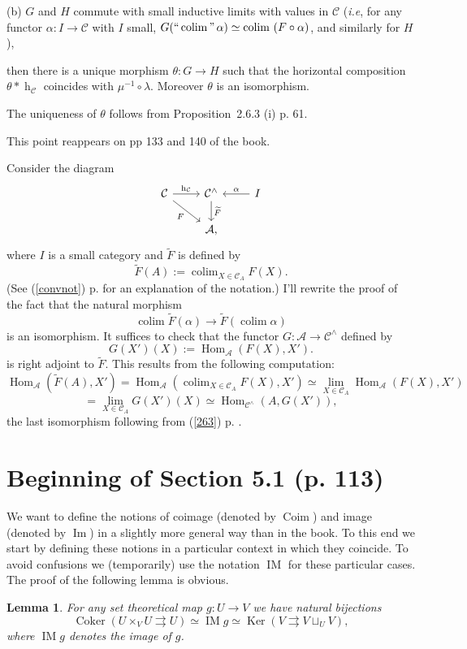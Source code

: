 \documentclass[12pt]{article}
\newtheorem{lem}[thm]{Lemma}
\theoremstyle{remark}
\newcommand{\n}{\noindent}
\newcommand{\A}{\mathcal A}
\newcommand{\C}{\mathcal C}
\newcommand{\pa}{\rightrightarrows}
\newcommand{\pr}{Proposition}
\newcommand{\cn}{(See (\ref{convnot}) p. \pageref{convnot} for an explanation of the notation.) }
\DeclareMathOperator*{\coli}{colim}
\DeclareMathOperator*{\co}{colim}
\DeclareMathOperator*{\ic}{``\coli"}
\DeclareMathOperator{\Coim}{Coim}
\DeclareMathOperator{\Coker}{Coker}
\DeclareMathOperator{\Ima}{Im}
\DeclareMathOperator{\IM}{IM}
\DeclareMathOperator{\hy}{h}
\DeclareMathOperator{\Hom}{Hom}
\DeclareMathOperator{\Ker}{Ker}
\begin{document}
\n(b) $G$ and $H$ commute with small inductive limits with values in $\C$ ({\em i.e}, for any functor $\alpha:I\to\C$ with $I$ small, $G(\ic\alpha)\simeq\co\ (F\circ\alpha)$, and similarly for $H$), 

\n then there is a unique morphism $\theta:G\to H$ such that the horizontal composition $\theta*\hy_\C$ coincides with $\mu^{-1}\circ\lambda$. Moreover $\theta$ is an isomorphism. 

The uniqueness of $\theta$ follows from \pr\ 2.6.3 (i) p. 61. 

This point reappears on pp 133 and 140 of the book. 

\n{\em Comment 2.} Consider the diagram 
%
\begin{equation}\label{271b}
\begin{tikzcd}
\C\ar{r}{\hy_\C}\ar{dr}[swap]{F}&\C^\wedge\ar{d}{\widetilde F}&I\ar{l}[swap]{\alpha}\\
&\A,
\end{tikzcd}
\end{equation} 
% 
where $I$ is a small category and $\widetilde F$ is defined by 
$$
\widetilde F(A):=\coli_{X\in\C_A}F(X). 
$$
\cn I'll rewrite the proof of the fact that the natural morphism 
%
$$
\coli\widetilde F(\alpha)\to
\widetilde F\left(\coli\alpha\right) 
$$ 
% 
is an isomorphism. It suffices to check that the functor $G:\A\to\C^\wedge$ defined by 
$$
G(X')(X):=\Hom_{\A}(F(X),X').
$$ 
is right adjoint to $\widetilde F$. This results from the following computation: 
$$
\Hom_{\A}\left(\widetilde F(A),X'\right)=
\Hom_{\A}\left(\coli_{X\in\C_A}F(X),X'\right)\simeq 
\lim_{X\in\C_A}\Hom_{\A}(F(X),X')
$$
$$
=\lim_{X\in\C_A}G(X')(X)\simeq\Hom_{\C^\wedge}(A,G(X')), 
$$ 
the last isomorphism following from (\ref{263}) p. \pageref{263}. 
% 
\section{Beginning of Section 5.1 (p. 113)}%
% 
We want to define the notions of coimage (denoted by $\Coim$) and image (denoted by $\Ima$) in a slightly more general way than in the book. To this end we start by defining these notions in a particular context in which they coincide. To avoid confusions we (temporarily) use the notation $\IM$ for these particular cases. The proof of the following lemma is obvious. 
%
\begin{lem}\label{imset} 
For any set theoretical map $g:U\to V$ we have natural bijections 
$$ 
\Coker(U\times_VU\pa U)\simeq\IM g\simeq\Ker(V\pa V\sqcup_UV),
$$ 
where $\IM g$ denotes the image of $g$. 
\end{lem} 
\end{document}
